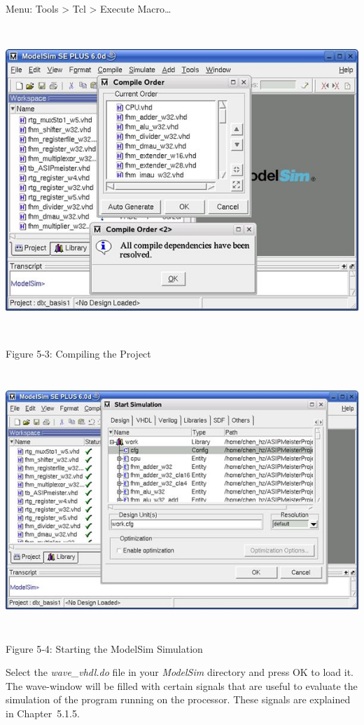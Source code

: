 \documentclass[
]{article}
\begin{document}
Menu: Tools \textgreater{} Tcl \textgreater{} Execute Macro\ldots{}

\includegraphics[width=6.19375in,height=4.58194in]{5-3.png}

Figure 5‑3: Compiling the Project

\includegraphics[width=6.19375in,height=3.83611in]{5-4.png}

Figure 5‑4\protect\hypertarget{Fig54}{}{}: Starting the ModelSim
Simulation

Select the \emph{wave\_vhdl.do} file in your \emph{ModelSim} directory
and press OK to load it. The wave-window will be filled with certain
signals that are useful to evaluate the simulation of the program
running on the processor. These signals are explained in Chapter~5.1.5.
\end{document}
